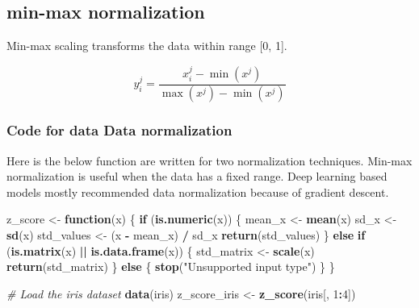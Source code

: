 \documentclass[a4paper,conference]{IEEEtran}
\newenvironment{Shaded}{\begin{snugshade}}{\end{snugshade}}
\newcommand{\CommentTok}[1]{\textcolor[rgb]{0.56,0.35,0.01}{\textit{#1}}}
\newcommand{\ControlFlowTok}[1]{\textcolor[rgb]{0.13,0.29,0.53}{\textbf{#1}}}
\newcommand{\DecValTok}[1]{\textcolor[rgb]{0.00,0.00,0.81}{#1}}
\newcommand{\FunctionTok}[1]{\textcolor[rgb]{0.13,0.29,0.53}{\textbf{#1}}}
\newcommand{\NormalTok}[1]{#1}
\newcommand{\OtherTok}[1]{\textcolor[rgb]{0.56,0.35,0.01}{#1}}
\newcommand{\SpecialCharTok}[1]{\textcolor[rgb]{0.81,0.36,0.00}{\textbf{#1}}}
\newcommand{\StringTok}[1]{\textcolor[rgb]{0.31,0.60,0.02}{#1}}
\begin{document}
\hypertarget{sec:min-max-normalization}{%
\subsection{min-max normalization}\label{sec:min-max-normalization}}

Min-max scaling transforms the data within range {[}0, 1{]}.

\[
y^j_{i} = \frac{x^j_{i} - \min(x^j)}{\max(x^j) - \min(x^j)}
\]

\hypertarget{sec:code-for-data-data-normalization}{%
\subsubsection{Code for data Data
normalization}\label{sec:code-for-data-data-normalization}}

Here is the below function are written for two normalization techniques.
Min-max normalization is useful when the data has a fixed range. Deep
learning based models mostly recommended data normalization because of
gradient descent.

\begin{Shaded}
\begin{Highlighting}[]
\NormalTok{z\_score }\OtherTok{\textless{}{-}} \ControlFlowTok{function}\NormalTok{(x) \{}
  \ControlFlowTok{if}\NormalTok{ (}\FunctionTok{is.numeric}\NormalTok{(x)) \{}
\NormalTok{    mean\_x }\OtherTok{\textless{}{-}} \FunctionTok{mean}\NormalTok{(x)}
\NormalTok{    sd\_x }\OtherTok{\textless{}{-}} \FunctionTok{sd}\NormalTok{(x)}
\NormalTok{    std\_values }\OtherTok{\textless{}{-}}\NormalTok{ (x }\SpecialCharTok{{-}}\NormalTok{ mean\_x) }\SpecialCharTok{/}\NormalTok{ sd\_x}
    \FunctionTok{return}\NormalTok{(std\_values)}
\NormalTok{  \} }\ControlFlowTok{else} \ControlFlowTok{if}\NormalTok{ (}\FunctionTok{is.matrix}\NormalTok{(x) }\SpecialCharTok{||} \FunctionTok{is.data.frame}\NormalTok{(x)) \{}
\NormalTok{    std\_matrix }\OtherTok{\textless{}{-}} \FunctionTok{scale}\NormalTok{(x)}
    \FunctionTok{return}\NormalTok{(std\_matrix)}
\NormalTok{  \} }\ControlFlowTok{else}\NormalTok{ \{}
    \FunctionTok{stop}\NormalTok{(}\StringTok{"Unsupported input type"}\NormalTok{)}
\NormalTok{  \}}
\NormalTok{\}}

\CommentTok{\# Load the iris dataset}
\FunctionTok{data}\NormalTok{(iris)}
\NormalTok{z\_score\_iris }\OtherTok{\textless{}{-}} \FunctionTok{z\_score}\NormalTok{(iris[, }\DecValTok{1}\SpecialCharTok{:}\DecValTok{4}\NormalTok{])}
\end{Highlighting}
\end{Shaded}
\end{document}
